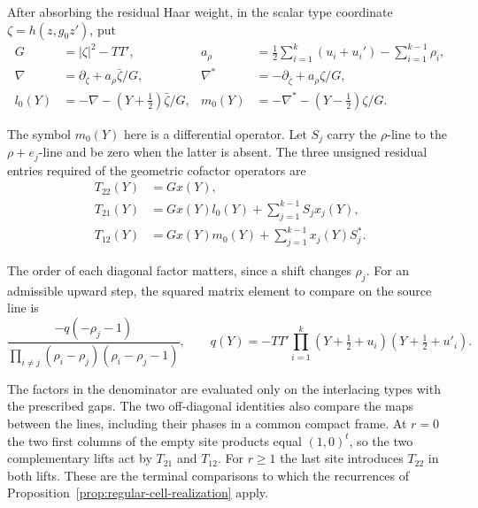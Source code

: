 After absorbing the residual Haar weight, in the scalar type coordinate \(\zeta=h(z,g_0z')\), put
\[
 \begin{aligned}
 G&=|\zeta|^2-TT',&
 a_\rho&=\tfrac12\sum_{i=1}^k(u_i+u_i')-\sum_{i=1}^{k-1}\rho_i,\\
 \nabla&=\partial_\zeta+a_\rho\bar\zeta/G,&
 \nabla^*&=-\partial_{\bar\zeta}+a_\rho\zeta/G,\\
 l_0(Y)&=-\nabla-(Y+\tfrac12)\bar\zeta/G,&
 m_0(Y)&=-\nabla^*-(Y-\tfrac12)\zeta/G .
 \end{aligned}
\]

The symbol \(m_0(Y)\) here is a differential operator. Let \(S_j\)
carry the \(\rho\)-line to the \(\rho+e_j\)-line and be zero when the
latter is absent. The three unsigned residual entries required of the
geometric cofactor operators are
\begin{equation}\label{eq:three-residual-cofactors}
 \begin{aligned}
 T_{22}(Y)&=Gx(Y),\\
 T_{21}(Y)&=Gx(Y)l_0(Y)+\sum_{j=1}^{k-1}S_jx_j(Y),\\
 T_{12}(Y)&=Gx(Y)m_0(Y)+\sum_{j=1}^{k-1}x_j(Y)S_j^* .
 \end{aligned}
\end{equation}

The order of each diagonal factor matters, since a shift changes
\(\rho_j\). For an admissible upward step, the squared matrix
element to compare on the source line is
\[
 \frac{-q(-\rho_j-1)}
 {\displaystyle\prod_{i\ne j}
       (\rho_i-\rho_j)(\rho_i-\rho_j-1)},\qquad
 q(Y)=-TT'\prod_{i=1}^k(Y+\tfrac12+u_i)(Y+\tfrac12+u'_i).
\]

The factors in the denominator are evaluated only on the interlacing
types with the prescribed gaps. The two off-diagonal identities
also compare the maps between the lines, including their phases
in a common compact frame. At \(r=0\) the two first columns of the
empty site products equal \((1,0)^t\), so the two complementary
lifts act by \(T_{21}\) and \(T_{12}\). For \(r\ge1\) the last site
introduces \(T_{22}\) in both lifts. These are the terminal
comparisons to which the recurrences of
Proposition~\ref{prop:regular-cell-realization} apply.

